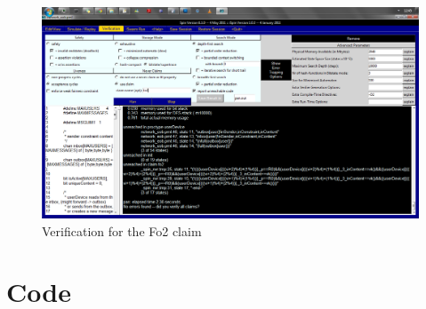 \documentclass[10pt,a4paper]{article}
\begin{document}
	\begin{figure}[t]
		\includegraphics[angle=90,totalheight=\textheight]{screenshots/verification_fo2.png}
		\caption{Verification for the Fo2 claim}
		\label{veriFo2}
	\end{figure}
	
	\section{Code}


	
\end{document}
